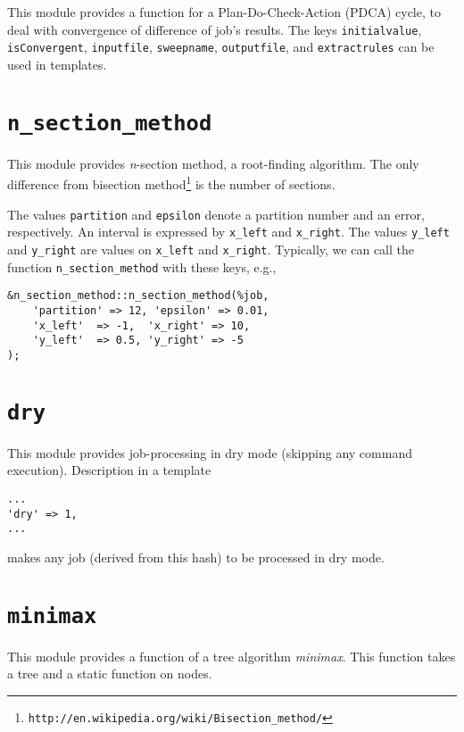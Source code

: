 \documentclass[a4paper,10pt]{report}
\begin{document}
This module provides a function for a Plan-Do-Check-Action (PDCA)
cycle, to deal with convergence of difference of job's results.  The
keys \texttt{initialvalue}, \texttt{isConvergent}, \texttt{inputfile},
\texttt{sweepname}, \texttt{outputfile}, and \texttt{extractrules} can
be used in templates.

\section{\texttt{n\_section\_method}}

This module provides \textit{n}-section method, a root-finding
algorithm. The only difference from bisection
method\footnote{\texttt{http://en.wikipedia.org/wiki/Bisection\_method/}}
is the number of sections.

The values \texttt{partition} and \texttt{epsilon} denote
    a partition number and an error, respectively.  An interval is
    expressed by \texttt{x\_left} and \texttt{x\_right}.  The values
    \texttt{y\_left} and \texttt{y\_right} are values on \texttt{x\_left}
    and \texttt{x\_right}.  Typically, we can call the function
    \texttt{n\_section\_method} with these keys, e.g.,
\begin{boxnote}
\begin{verbatim}
&n_section_method::n_section_method(%job,
    'partition' => 12, 'epsilon' => 0.01,
    'x_left'  => -1,  'x_right' => 10,
    'y_left'  => 0.5, 'y_right' => -5
);
\end{verbatim}
\end{boxnote}

\section{\texttt{dry}}

This module provides job-processing in dry mode (skipping any command
execution).  Description in a template
\begin{boxnote}
\begin{verbatim}
...
'dry' => 1,
...
\end{verbatim}
\end{boxnote}
\noindent
makes any job (derived from this hash) to be processed in dry mode.

\section{\texttt{minimax}}

This module provides a function of a tree algorithm \textit{minimax}.
This function takes a tree and a static function on nodes.
\end{document}
